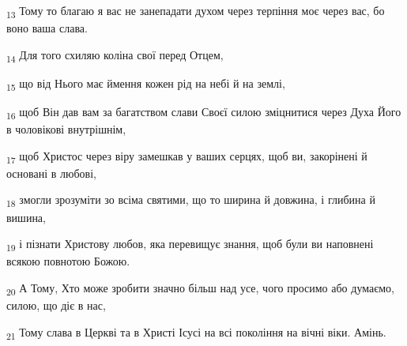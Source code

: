 \begin{tcolorbox}
\textsubscript{13} Тому то благаю я вас не занепадати духом через терпіння моє через вас, бо воно ваша слава.
\end{tcolorbox}
\begin{tcolorbox}
\textsubscript{14} Для того схиляю коліна свої перед Отцем,
\end{tcolorbox}
\begin{tcolorbox}
\textsubscript{15} що від Нього має ймення кожен рід на небі й на землі,
\end{tcolorbox}
\begin{tcolorbox}
\textsubscript{16} щоб Він дав вам за багатством слави Своєї силою зміцнитися через Духа Його в чоловікові внутрішнім,
\end{tcolorbox}
\begin{tcolorbox}
\textsubscript{17} щоб Христос через віру замешкав у ваших серцях, щоб ви, закорінені й основані в любові,
\end{tcolorbox}
\begin{tcolorbox}
\textsubscript{18} змогли зрозуміти зо всіма святими, що то ширина й довжина, і глибина й вишина,
\end{tcolorbox}
\begin{tcolorbox}
\textsubscript{19} і пізнати Христову любов, яка перевищує знання, щоб були ви наповнені всякою повнотою Божою.
\end{tcolorbox}
\begin{tcolorbox}
\textsubscript{20} А Тому, Хто може зробити значно більш над усе, чого просимо або думаємо, силою, що діє в нас,
\end{tcolorbox}
\begin{tcolorbox}
\textsubscript{21} Тому слава в Церкві та в Христі Ісусі на всі покоління на вічні віки. Амінь.
\end{tcolorbox}
